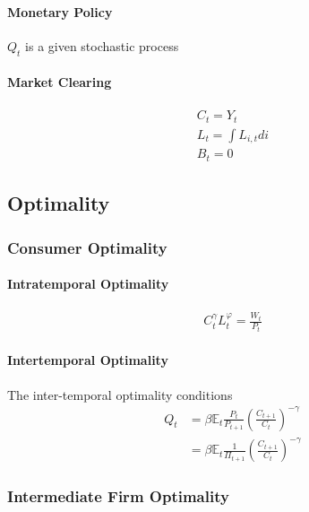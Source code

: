\documentclass[10pt]{article}
\begin{document}
\paragraph{Monetary Policy}

$Q_t$ is a given stochastic process

\paragraph{Market Clearing}

\begin{align}
    C_t=Y_t \\
    L_t=\int L_{i, t} d i \\
    B_t=0
\end{align}


\subsection{Optimality}

\subsubsection{Consumer Optimality}

\paragraph{Intratemporal Optimality}

\begin{align}
    C_t^\gamma L_t^{\varphi}=\frac{W_t}{P_t}
\end{align}

\paragraph{Intertemporal Optimality}

The inter-temporal optimality conditions
$$
\begin{aligned}
Q_t & =\beta \mathbb{E}_t \frac{P_t}{P_{t+1}}\left(\frac{C_{t+1}}{C_t}\right)^{-\gamma} \\
& =\beta \mathbb{E}_t \frac{1}{\Pi_{t+1}}\left(\frac{C_{t+1}}{C_t}\right)^{-\gamma}
\end{aligned}
$$

\subsubsection{Intermediate Firm Optimality}
\end{document}
